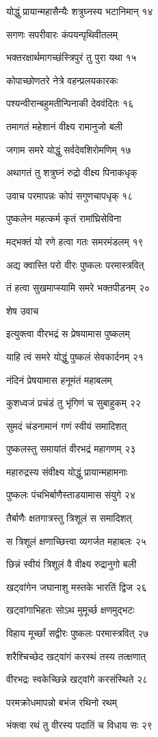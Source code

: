 योद्धुं प्रायान्महासैन्यैः शत्रुघ्नस्य भटानिमान् १४

सगणः सपरीवारः कंपयन्पृथिवीतलम्

भक्तरक्षार्थमागच्छंस्त्रिपुरं तु पुरा यथा १५

कोपाच्छोणतरे नेत्रे वहन्प्रलयकारकः

पश्यन्वीरान्बहुमतीन्पिनाकी देववंदितः १६

तमागतं महेशानं वीक्ष्य रामानुजो बली

जगाम समरे योद्धुं सर्वदेवशिरोमणिम् १७

अथागतं तु शत्रुघ्नं रुद्रो वीक्ष्य पिनाकधृक्

उवाच परमापन्नः कोपं सगुणचापधृक् १८

पुष्कलेन महत्कर्म कृतं रामांघ्रिसेविना

मद्भक्तं यो रणे हत्वा गतः समरमंडलम् १९

अद्य क्वास्ति परो वीरः पुष्कलः परमास्त्रवित्

तं हत्वा सुखमाप्स्यामि समरे भक्तपीडनम् २०

शेष उवाच

इत्युक्त्वा वीरभद्रं स प्रेषयामास पुष्कलम्

याहि त्वं समरे योद्धुं पुष्कलं सेवकार्दनम् २१

नंदिनं प्रेषयामास हनूमंतं महाबलम्

कुशध्वजं प्रचंडं तु भृंगिणं च सुबाहुकम् २२

सुमदं चंडनामानं गणं स्वीयं समादिशत्

पुष्कलस्तु समायांतं वीरभद्रं महागणम् २३

महारुद्रस्य संवीक्ष्य योद्धुं प्रायान्महामनाः

पुष्कलः पंचभिर्बाणैस्ताडयामास संयुगे २४

तैर्बाणैः क्षतगात्रस्तु त्रिशूलं स समादिशत्

स त्रिशूलं क्षणाच्छित्त्वा व्यगर्जत महाबलः २५

छिन्नं स्वीयं त्रिशूलं वै वीक्ष्य रुद्रानुगो बली

खट्वांगेन जघानाशु मस्तके भारतिं द्विज २६

खट्वांगाभिहतः सोऽथ मुमूर्च्छ क्षणमुद्भटः

विहाय मूर्च्छां सद्वीरः पुष्कलः परमास्त्रवित् २७

शरैश्चिच्छेद खट्वांगं करस्थं तस्य तत्क्षणात्

वीरभद्रः स्वकेच्छिन्ने खट्वांगे करसंस्थिते २८

परमक्रोधमापन्नो बभंज रथिनो रथम्

भंक्त्वा रथं तु वीरस्य पदातिं च विधाय सः २९

